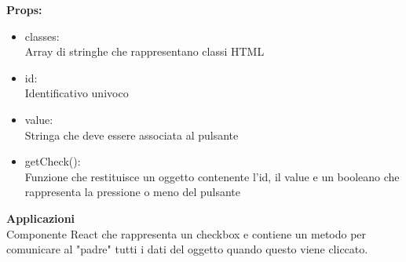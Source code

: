 \textbf{Props:} 
\begin{itemize}

\item classes: 
\\
Array di stringhe che rappresentano classi HTML
\item id:
\\
Identificativo univoco 
\item value:
\\
Stringa che deve essere associata al pulsante
\item getCheck():
\\
Funzione che restituisce un oggetto contenente l'id, il value e un booleano che rappresenta la pressione o meno del pulsante

\end{itemize} 


\textbf{Applicazioni}\\
Componente React che rappresenta un checkbox e contiene un metodo per comunicare al "padre" tutti i dati del oggetto quando questo viene cliccato. 


\clearpage

